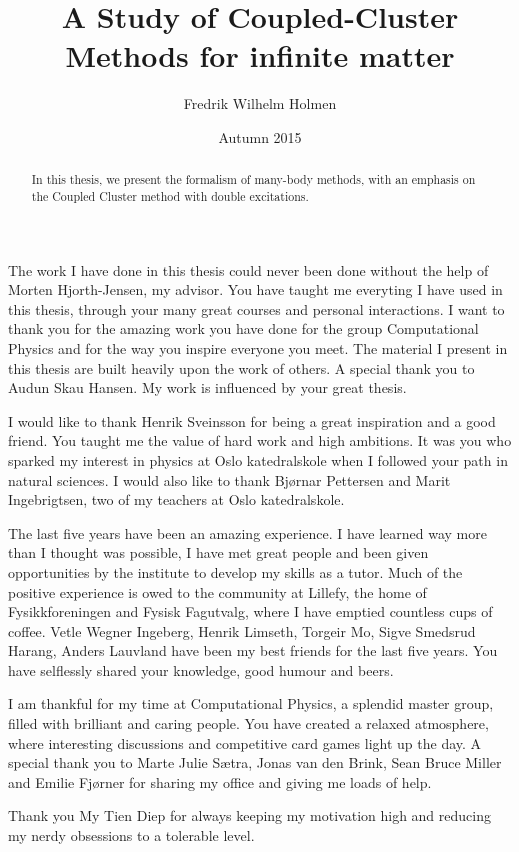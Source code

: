 \documentclass[twoside,english]{uiofysmaster}
\author{Fredrik Wilhelm Holmen}
\title{A Study of Coupled-Cluster Methods for infinite matter}
\date{Autumn 2015}
\begin{document}
\setlength{\belowdisplayskip}{12pt} \setlength{\belowdisplayshortskip}{12pt}
\setlength{\abovedisplayskip}{12pt} \setlength{\abovedisplayshortskip}{12pt}


\maketitle

\begin{abstract}
	In this thesis, we present the formalism of many-body methods, with an emphasis on the Coupled Cluster method with double excitations. 
\end{abstract}

\begin{acknowledgements}
	The work I have done in this thesis could never been done without the help of Morten Hjorth-Jensen, my advisor. You have taught me everyting I have used in this thesis, through your many great courses and personal interactions. I want to thank you for the amazing work you have done for the group Computational Physics and for the way you inspire everyone you meet. The material I present in this thesis are built heavily upon the work of others. A special thank you to Audun Skau Hansen. My work is influenced by your great thesis. 

	I would like to thank Henrik Sveinsson for being a great inspiration and a good friend. You taught me the value of hard work and high ambitions. It was you who sparked my interest in physics at Oslo katedralskole when I followed your path in natural sciences. I would also like to thank Bj\o rnar Pettersen and Marit Ingebrigtsen, two of my teachers at Oslo katedralskole. 

	The last five years have been an amazing experience. I have learned way more than I thought was possible, I have met great people and been given opportunities by the institute to develop my skills as a tutor. Much of the positive experience is owed to the community at Lillefy, the home of Fysikkforeningen and Fysisk Fagutvalg, where I have emptied countless cups of coffee. Vetle Wegner Ingeberg, Henrik Limseth, Torgeir Mo, Sigve Smedsrud Harang, Anders Lauvland have been my best friends for the last five years. You have selflessly shared your knowledge, good humour and beers. 

	I am thankful for my time at Computational Physics, a splendid master group, filled with brilliant and caring people. You have created a relaxed atmosphere, where interesting discussions and competitive card games light up the day. A special thank you to Marte Julie Sætra, Jonas van den Brink, Sean Bruce Miller and Emilie Fj\o rner for sharing my office and giving me loads of help. 

	Thank you My Tien Diep for always keeping my motivation high and reducing my nerdy obsessions to a tolerable level.

\end{acknowledgements}
\end{document}
